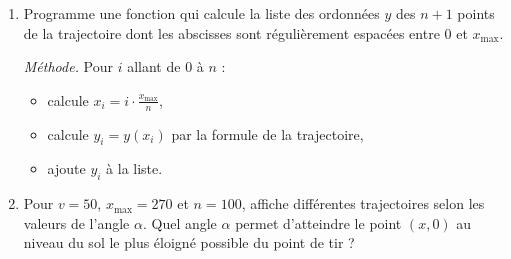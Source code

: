 \documentclass[11pt,class=report,crop=false]{standalone}
\begin{document}
\begin{activite}
\begin{enumerate}
  \item Programme une fonction  qui calcule la liste des ordonnées $y$ des $n+1$ points de la trajectoire dont les abscisses sont régulièrement espacées entre $0$ et $x_{\max}$. 
  
  \emph{Méthode.} Pour $i$ allant de $0$ à $n$ :
  \begin{itemize}
    \item calcule $x_i = i \cdot \frac{x_{\max}}{n}$,    
    \item calcule $y_i = y(x_i)$ par la formule de la trajectoire,
    \item ajoute $y_i$ à la liste.
  \end{itemize}  
  
  
  \item Pour $v=50$, $x_{\max} = 270$ et $n=100$, affiche différentes trajectoires selon les valeurs de l'angle $\alpha$. Quel angle $\alpha$ permet d'atteindre le point $(x,0)$ au niveau du sol le plus éloigné possible du point de tir ?
  
  
\end{enumerate}

\end{activite}
\end{document}
